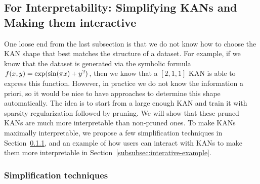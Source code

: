 \documentclass{article}
\numberwithin{equation}{section}
\numberwithin{figure}{section}
\begin{document}
\subsection{For Interpretability: Simplifying KANs and Making them interactive}\label{subsec:kan_simplification}

One loose end from the last subsection is that we do not know how to choose the KAN shape that best matches the structure of a dataset. For example, if we know that the dataset is generated via the symbolic formula $f(x,y) = {\rm exp}({\rm sin}(\pi x)+y^2)$, then we know that a $[2,1,1]$ KAN is able to express this function. However, in practice we do not know the information a priori, so it would be nice to have approaches to determine this shape automatically. The idea is to start from a large enough KAN and train it with sparsity regularization followed by pruning. We will show that these pruned KANs are much more interpretable than non-pruned ones. To make KANs maximally interpretable, we propose a few simplification techniques in Section~\ref{subsubsec:simplification}, and an example of how users can interact with KANs to make them more interpretable in Section~\ref{subsubsec:interative-example}.


\subsubsection{Simplification techniques}\label{subsubsec:simplification}
\end{document}
